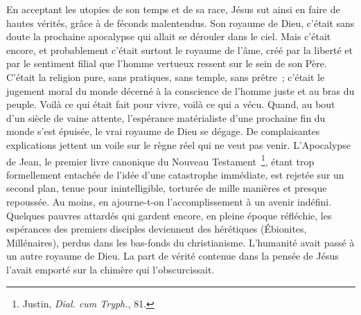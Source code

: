 \documentclass[french,twoside]{book} %
\begin{document}
En acceptant les utopies de son temps et de sa race, Jésus sut ainsi en faire de hautes vérités, grâce à de féconds malentendus. Son royaume de Dieu, c’était sans doute la prochaine apocalypse qui allait se dérouler dans le ciel. Mais c’était encore, et probablement c’était surtout le royaume de l’âme, créé par la liberté et par le sentiment filial que l’homme vertueux ressent sur le sein de son Père. C’était la religion pure, sans pratiques, sans temple, sans prêtre ; c’était le jugement moral du monde décerné à la conscience de l’homme juste et au bras du peuple. Voilà ce qui était fait pour vivre, voilà ce qui a vécu. Quand, au bout d’un siècle de vaine attente, l’espérance matérialiste d’une prochaine fin du monde s’est épuisée, le vrai royaume de Dieu se dégage. De complaisantes explications jettent un voile sur le règne réel qui ne veut pas venir. L’Apocalypse de Jean, le premier livre canonique du Nouveau Testament \footnote{ Justin, {\itshape Dial. cum Tryph.}, 81.}, étant trop formellement entachée de l’idée d’une catastrophe immédiate, est rejetée sur un second plan, tenue pour inintelligible, torturée de mille manières et presque repoussée. Au moins, en ajourne-t-on l’accomplissement à un avenir indéfini. Quelques pauvres attardés qui gardent encore, en pleine époque réfléchie, les espérances des premiers disciples deviennent des hérétiques (Ébionites, Millénaires), perdus dans les bas-fonds du christianisme. L’humanité avait passé à un autre royaume de Dieu. La part de vérité contenue dans la pensée de Jésus l’avait emporté sur la chimère qui l’obscurcissait.\par
\end{document}

